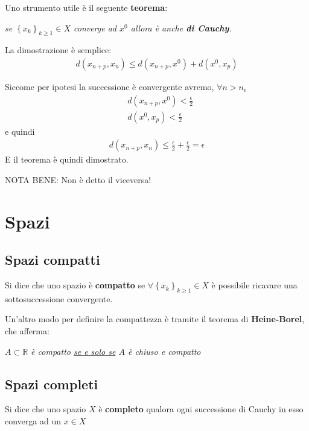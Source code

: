 Uno strumento utile è il seguente \textbf{teorema}:

\bigskip

\textit{se $\left\{ x_k \right\}_{k\geq 1}\in X$ converge ad $x^0$ allora è anche \textbf{di Cauchy}}.

\bigskip

La dimostrazione è semplice:
\begin{align}
d(x_{n+p}, x_n) \leq d(x_{n+p}, x^0) + d(x^0, x_p)
\end{align}

Siccome per ipotesi la successione è convergente avremo, $\forall n>n_\epsilon$
\begin{align}
{}&d(x_{n+p}, x^0) < \frac{\epsilon}{2} \\
&d(x^0, x_p) < \frac{\epsilon}{2}
\end{align}
e quindi
\begin{align}
d(x_{n+p}, x_n) \leq \frac{\epsilon}{2} + \frac{\epsilon}{2}=\epsilon
\end{align}
E il teorema è quindi dimostrato.

\bigskip

NOTA BENE: Non è detto il viceversa!

\newpage

\section{Spazi}

\subsection{Spazi compatti}

Si dice che uno spazio è \textbf{compatto} se $\forall \left\{ x_k \right\}_{k\geq 1}\in X$ è possibile ricavare una sottosuccessione convergente.

Un'altro modo per definire la compattezza è tramite il teorema di \textbf{Heine-Borel}, che afferma:

\bigskip

\textit{$A \subset \mathbb{R}$ è compatto \underline{se e solo se} $A$ è chiuso e compatto}

\subsection{Spazi completi}

Si dice che uno spazio $X$ è \textbf{completo} qualora ogni successione di Cauchy in esso converga ad un $x\in X$

